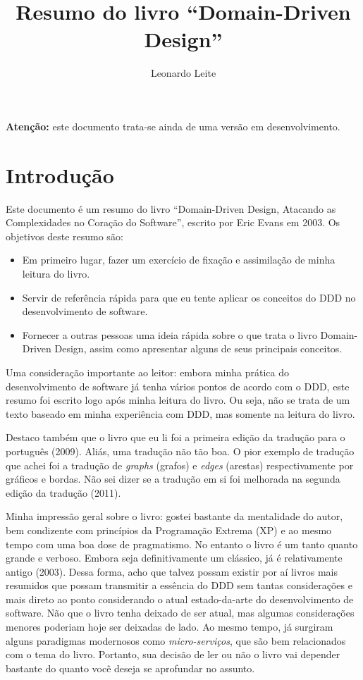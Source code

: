 \documentclass[a4paper, 12pt]{article}
\title{Resumo do livro ``Domain-Driven Design''}
\author{Leonardo Leite}
\begin{document}
\maketitle

\textbf{Atenção: } este documento trata-se ainda de uma versão em desenvolvimento.

\section{Introdução}


Este documento é um resumo do livro ``Domain-Driven Design, Atacando as Complexidades no Coração do Software'', escrito por Eric Evans em 2003. Os objetivos deste resumo são:

\begin{itemize}
\item Em primeiro lugar, fazer um exercício de fixação e assimilação de minha leitura do livro.
\item Servir de referência rápida para que eu tente aplicar os conceitos do DDD no desenvolvimento de software.
\item Fornecer a outras pessoas uma ideia rápida sobre o que trata o livro Domain-Driven Design, assim como apresentar alguns de seus principais conceitos.
\end{itemize}

Uma consideração importante ao leitor: embora minha prática do desenvolvimento de software já tenha vários pontos de acordo com o DDD, este resumo foi escrito logo após minha leitura do livro. Ou seja, não se trata de um texto baseado em minha experiência com DDD, mas somente na leitura do livro.

Destaco também que o livro que eu li foi a primeira edição da tradução para o português (2009). Aliás, uma tradução não tão boa. O pior exemplo de tradução que achei foi a tradução de \emph{graphs} (grafos) e \emph{edges} (arestas) respectivamente por gráficos e bordas. Não sei dizer se a tradução em si foi melhorada na segunda edição da tradução (2011).

Minha impressão geral sobre o livro: gostei bastante da mentalidade do autor, bem condizente com princípios da Programação Extrema (XP) e ao mesmo tempo com uma boa dose de pragmatismo. No entanto o livro é um tanto quanto grande e verboso. Embora seja definitivamente um clássico, já é relativamente antigo (2003). Dessa forma, acho que talvez possam existir por aí livros mais resumidos que possam transmitir a essência do DDD sem tantas considerações e mais direto ao ponto considerando o atual estado-da-arte do desenvolvimento de software. Não que o livro tenha deixado de ser atual, mas algumas considerações menores poderiam hoje ser deixadas de lado. Ao mesmo tempo, já surgiram alguns paradigmas modernosos como \emph{micro-serviços}, que são bem relacionados com o tema do livro. Portanto, sua decisão de ler ou não o livro vai depender bastante do quanto você deseja se aprofundar no assunto.
\end{document}
